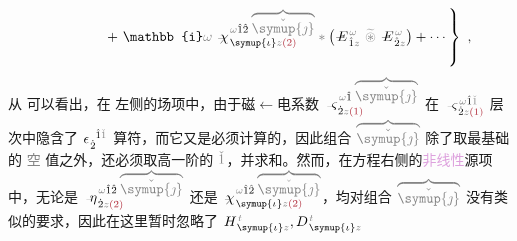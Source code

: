 \begin{subequations}
\begin{align}
	&~~~~~~~~~~~~~~~ +\left. \mathbb{i} \mathcolor{gray}{\omega} ~\xint{{}^{}_{\mathcolor{gray}{-}}}{23}{\chi}^{\;\! \mathcolor{gray}{\omega} \hat{1} \hat{2} \;\! \mathcolor{gray}{\overbrace{\check{\symup{\jmath}}}}}_{\;\! \symup{\iota} \mathcolor{gray}{z} \textcolor{Maroon}{(2)}} \mathcolor{gray}{*} \left( \xint{\mathcolor{gray}{-}}{295}{E}^{\;\!\mathcolor{gray}{\omega}}_{\;\! \hat{1} \mathcolor{gray}{z}} ~\mathcolor{gray}{\widetilde \circledast}~ \xint{\mathcolor{gray}{-}}{295}{E}^{\;\!\mathcolor{gray}{\omega}}_{\;\! \hat{2} \mathcolor{gray}{z}} \right) + \cdots \right\}~,
\end{align}
\end{subequations}
\clearpage
从  可以看出，在  左侧的场项中，由于\textcolor{NavyBlue}{磁$\longleftarrow$电}系数 $\xint{\begin{smallmatrix} ~ \\ {}^{}_{\mathcolor{gray}{-}} \\ ~ \end{smallmatrix}}{13}{\varsigma}^{\;\! \mathcolor{gray}{\omega} \hat{1} \;\! \mathcolor{gray}{\overbrace{\check{\symup{\jmath}}}}}_{\;\! \dot{2} \mathcolor{gray}{z} \textcolor{Maroon}{(1)}}$ 在 $\xint{\begin{smallmatrix} ~ \\ {}^{}_{\mathcolor{gray}{-}} \\ ~ \end{smallmatrix}}{13}{\varsigma}^{\;\! \mathcolor{gray}{\omega} \hat{1} \mathcolor{gray}{\check{1}}}_{\;\! \dot{2} \mathcolor{gray}{z} \textcolor{Maroon}{(1)}}$ 层次中隐含了 $\epsilon^{\;\! \hphantom{\dot{2}} \hat{1} \mathcolor{gray}{\check{1}}}_{\;\! \dot{2}}$ 算符，而它又是必须计算的，因此组合 $\mathcolor{gray}{\overbrace{\check{\symup{\jmath}}}}$ 除了取最基础的 \textcolor{gray}{空} 值之外，还必须取高一阶的 $\mathcolor{gray}{\check{1}}$，并求和。然而，在方程右侧的\textcolor{Plum}{非线性}源项中，无论是 $\xint{\begin{smallmatrix} ~ \\ {}^{}_{\mathcolor{gray}{-}} \\ ~ \end{smallmatrix}}{17}{\eta}^{\;\! \mathcolor{gray}{\omega} \hat{1} \hat{2} \;\! \mathcolor{gray}{\overbrace{\check{\symup{\jmath}}}}}_{\;\! \dot{2} \mathcolor{gray}{z} \textcolor{Maroon}{(2)}}$ 还是 $\xint{{}^{}_{\mathcolor{gray}{-}}}{23}{\chi}^{\;\! \mathcolor{gray}{\omega} \hat{1} \hat{2} \;\! \mathcolor{gray}{\overbrace{\check{\symup{\jmath}}}}}_{\;\! \symup{\iota} \mathcolor{gray}{z} \textcolor{Maroon}{(2)}}$，均对组合 $\mathcolor{gray}{\overbrace{\check{\symup{\jmath}}}}$ 没有类似的要求，因此在这里暂时忽略了 $H^{\;\!\mathcolor{gray}{t}}_{\;\! \symup{\iota}\mathcolor{gray}{z}}, D^{\;\!\mathcolor{gray}{t}}_{\;\! \symup{\iota}\mathcolor{gray}{z}}$ 